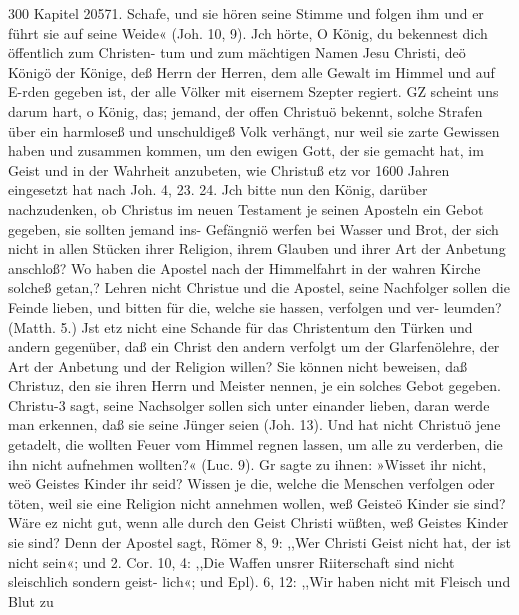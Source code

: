 300 Kapitel 20571.
Schafe, und sie hören seine Stimme und folgen ihm und er führt
sie auf seine Weide« (Joh. 10, 9).
Jch hörte, O König, du bekennest dich öffentlich zum Christen-
tum und zum mächtigen Namen Jesu Christi, deö Königö der
Könige, deß Herrn der Herren, dem alle Gewalt im Himmel und
auf E-rden gegeben ist, der alle Völker mit eisernem Szepter
regiert. GZ scheint uns darum hart, o König, das; jemand, der
offen Christuö bekennt, solche Strafen über ein harmloseß und
unschuldigeß Volk verhängt, nur weil sie zarte Gewissen haben
und zusammen kommen, um den ewigen Gott, der sie gemacht
hat, im Geist und in der Wahrheit anzubeten, wie Christuß etz vor
1600 Jahren eingesetzt hat nach Joh. 4, 23. 24.
Jch bitte nun den König, darüber nachzudenken, ob Christus
im neuen Testament je seinen Aposteln ein Gebot gegeben, sie
sollten jemand ins- Gefängniö werfen bei Wasser und Brot, der
sich nicht in allen Stücken ihrer Religion, ihrem Glauben und
ihrer Art der Anbetung anschloß? Wo haben die Apostel nach
der Himmelfahrt in der wahren Kirche solcheß getan,? Lehren
nicht Christue und die Apostel, seine Nachfolger sollen die Feinde
lieben, und bitten für die, welche sie hassen, verfolgen und ver-
leumden? (Matth. 5.)
Jst etz nicht eine Schande für das Christentum den Türken
und andern gegenüber, daß ein Christ den andern verfolgt um
der Glarfenölehre, der Art der Anbetung und der Religion
willen? Sie können nicht beweisen, daß Christuz, den sie ihren
Herrn und Meister nennen, je ein solches Gebot gegeben. Christu-3
sagt, seine Nachsolger sollen sich unter einander lieben, daran
werde man erkennen, daß sie seine Jünger seien (Joh. 13). Und
hat nicht Christuö jene getadelt, die wollten Feuer vom Himmel
regnen lassen, um alle zu verderben, die ihn nicht aufnehmen
wollten?« (Luc. 9). Gr sagte zu ihnen: »Wisset ihr nicht, weö
Geistes Kinder ihr seid? Wissen je die, welche die Menschen
verfolgen oder töten, weil sie eine Religion nicht annehmen
wollen, weß Geisteö Kinder sie sind? Wäre ez nicht gut,
wenn alle durch den Geist Christi wüßten, weß Geistes
Kinder sie sind? Denn der Apostel sagt, Römer 8, 9: ,,Wer
Christi Geist nicht hat, der ist nicht sein«; und 2. Cor. 10, 4:
,,Die Waffen unsrer Riiterschaft sind nicht sleischlich sondern geist-
lich«; und Epl). 6, 12: ,,Wir haben nicht mit Fleisch und Blut zu


